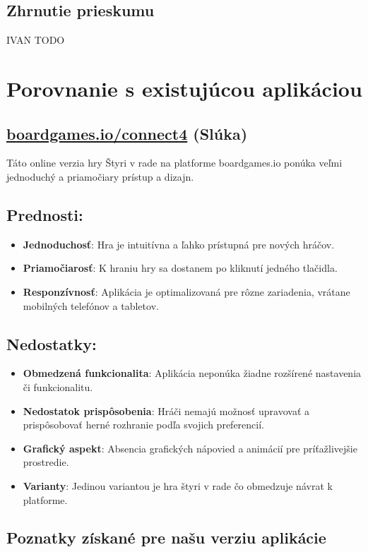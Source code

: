 \documentclass[a4paper, 11pt, onecolumn]{article}
\begin{document}
\subsection*{Zhrnutie prieskumu}
IVAN TODO
\section{Porovnanie s existujúcou aplikáciou}
\subsection{\href{https://boardgames.io/en/connect4/gameEnd}{boardgames.io/connect4} (Slúka)}

Táto online verzia hry Štyri v rade na platforme boardgames.io ponúka veľmi jednoduchý a 
priamočiary prístup a dizajn.

\subsection*{Prednosti:}
\begin{itemize}
    \item \textbf{Jednoduchosť}: Hra je intuitívna a ľahko prístupná pre nových hráčov.
    \item \textbf{Priamočiarosť}: K hraniu hry sa dostanem po kliknutí jedného tlačidla. 
    \item \textbf{Responzívnosť}: Aplikácia je optimalizovaná pre rôzne zariadenia, vrátane mobilných telefónov a tabletov.
\end{itemize}

\subsection*{Nedostatky:}
\begin{itemize}
    \item \textbf{Obmedzená funkcionalita}: Aplikácia neponúka žiadne rozšírené nastavenia či funkcionalitu.
    \item \textbf{Nedostatok prispôsobenia}: Hráči nemajú možnosť upravovať a prispôsobovať herné rozhranie podľa svojich preferencií.
    \item \textbf{Grafický aspekt}: Absencia grafických nápovied a animácií pre príťažlivejšie prostredie.
    \item \textbf{Varianty}: Jedinou variantou je hra štyri v rade čo obmedzuje návrat k platforme.
\end{itemize}

\subsection*{Poznatky získané pre našu verziu aplikácie}
\end{document}
